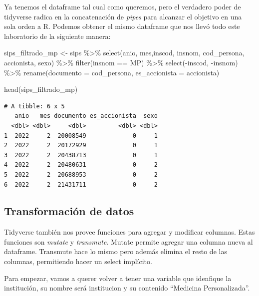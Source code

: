 \documentclass[
  letterpaper,
  DIV=11,
  numbers=noendperiod]{scrreprt}
\newenvironment{Shaded}{\begin{snugshade}}{\end{snugshade}}
\newcommand{\AttributeTok}[1]{\textcolor[rgb]{0.40,0.45,0.13}{#1}}
\newcommand{\FunctionTok}[1]{\textcolor[rgb]{0.28,0.35,0.67}{#1}}
\newcommand{\NormalTok}[1]{\textcolor[rgb]{0.00,0.23,0.31}{#1}}
\newcommand{\OtherTok}[1]{\textcolor[rgb]{0.00,0.23,0.31}{#1}}
\newcommand{\SpecialCharTok}[1]{\textcolor[rgb]{0.37,0.37,0.37}{#1}}
\newcommand{\StringTok}[1]{\textcolor[rgb]{0.13,0.47,0.30}{#1}}
\begin{document}
Ya tenemos el dataframe tal cual como queremos, pero el verdadero poder
de tidyverse radica en la concatenación de \emph{pipes} para alcanzar el
objetivo en una sola orden a R. Podemos obtener el mismo dataframe que
nos llevó todo este laboratorio de la siguiente manera:

\begin{Shaded}
\begin{Highlighting}[]
\NormalTok{sips\_filtrado\_mp }\OtherTok{\textless{}{-}}\NormalTok{ sips }\SpecialCharTok{\%\textgreater{}\%} 
  \FunctionTok{select}\NormalTok{(anio, mes,inscod, insnom, cod\_persona, accionista, sexo) }\SpecialCharTok{\%\textgreater{}\%} 
  \FunctionTok{filter}\NormalTok{(insnom }\SpecialCharTok{==} \StringTok{\textquotesingle{}MP\textquotesingle{}}\NormalTok{) }\SpecialCharTok{\%\textgreater{}\%} 
  \FunctionTok{select}\NormalTok{(}\SpecialCharTok{{-}}\NormalTok{inscod, }\SpecialCharTok{{-}}\NormalTok{insnom) }\SpecialCharTok{\%\textgreater{}\%} 
  \FunctionTok{rename}\NormalTok{(}\AttributeTok{documento =}\NormalTok{ cod\_persona, }\AttributeTok{es\_accionista =}\NormalTok{ accionista)}
  
\FunctionTok{head}\NormalTok{(sips\_filtrado\_mp)}
\end{Highlighting}
\end{Shaded}

\begin{verbatim}
# A tibble: 6 x 5
   anio   mes documento es_accionista  sexo
  <dbl> <dbl>     <dbl>         <dbl> <dbl>
1  2022     2  20008549             0     1
2  2022     2  20172929             0     1
3  2022     2  20438713             0     1
4  2022     2  20480631             0     2
5  2022     2  20688953             0     2
6  2022     2  21431711             0     2
\end{verbatim}

\hypertarget{transformaciuxf3n-de-datos}{%
\subsection{Transformación de datos}\label{transformaciuxf3n-de-datos}}

Tidyverse también nos provee funciones para agregar y modificar
columnas. Estas funciones son \emph{mutate} y \emph{transmute}. Mutate
permite agregar una columna nueva al dataframe. Transmute hace lo mismo
pero además elimina el resto de las columnas, permitiendo hacer un
select implícito.

Para empezar, vamos a querer volver a tener una variable que idenfique
la institución, su nombre será institucion y su contenido ``Medicina
Personalizada''.
\end{document}
